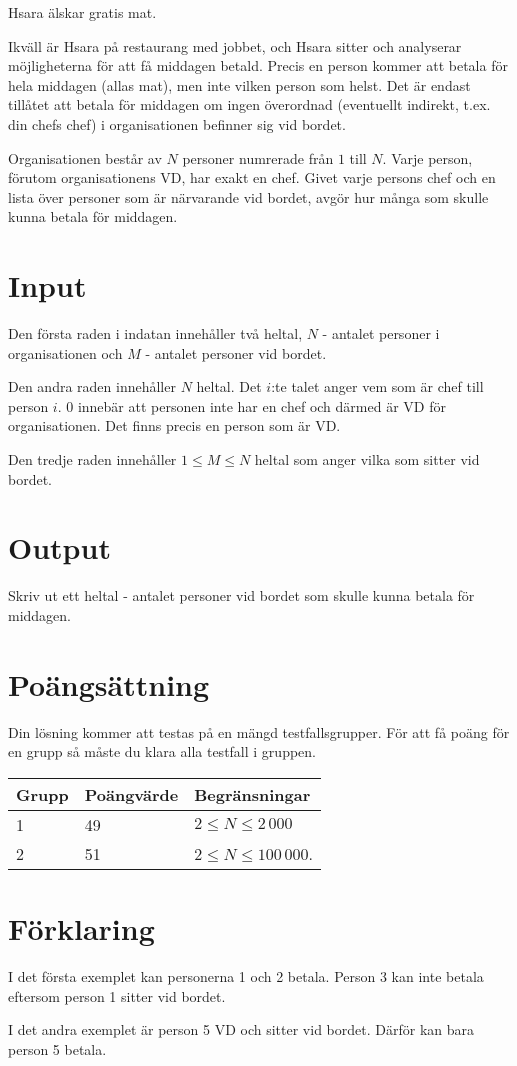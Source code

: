 
Hsara älskar gratis mat.

Ikväll är Hsara på restaurang med jobbet, och Hsara sitter och analyserar möjligheterna för att få middagen betald. Precis en person kommer att betala för hela middagen (allas mat), men inte vilken person som helst. Det är endast tillåtet att betala för middagen om ingen överordnad (eventuellt indirekt, t.ex. din chefs chef) i organisationen befinner sig vid bordet.

Organisationen består av $N$ personer numrerade från $1$ till $N$. Varje person, förutom organisationens VD, har exakt en chef. Givet varje persons chef och en lista över personer som är närvarande vid bordet, avgör hur många som skulle kunna betala för middagen.

\section*{Input}

Den första raden i indatan innehåller två heltal, $N$ - antalet personer i organisationen och $M$ - antalet personer vid bordet.

Den andra raden innehåller $N$ heltal. Det $i$:te talet anger vem som är chef till person $i$. 0 innebär att personen inte har en chef och därmed är VD för organisationen. Det finns precis en person som är VD.

Den tredje raden innehåller $1 \le M \le N$ heltal som anger vilka som sitter vid bordet.

\section*{Output}
Skriv ut ett heltal - antalet personer vid bordet som skulle kunna betala för middagen.

\section*{Poängsättning}
Din lösning kommer att testas på en mängd testfallsgrupper. För att få poäng för en grupp så måste du klara alla testfall i gruppen.

\begin{tabular}{| l | l | l |}
	\hline
	Grupp & Poängvärde & Begränsningar\\ \hline
  1     & 49         & $2 \le N \le 2\,000$ \\ \hline
  2     & 51         & $2 \le N \le 100\,000$. \\ \hline
\end{tabular}

\section*{Förklaring}
I det första exemplet kan personerna 1 och 2 betala. Person 3 kan inte betala eftersom person 1 sitter vid bordet.

I det andra exemplet är person 5 VD och sitter vid bordet. Därför kan bara person 5 betala.
